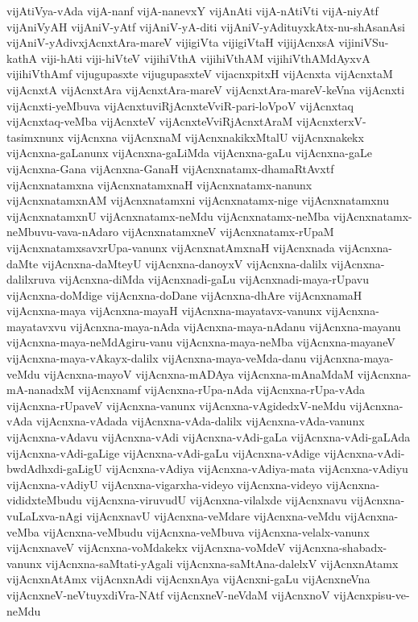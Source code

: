{vijAtiVya-vAda
vijA-nanf
vijA-nanevxY
vijAnAti
vijA-nAtiVti
vijA-niyAtf
vijAniVyAH
vijAniV-yAtf
vijAniV-yA-diti
vijAniV-yAdituyxkAtx-nu-shAsanAsi
vijAniV-yAdivxjAcnxtAra-mareV
vijigiVta
vijigiVtaH
vijijAcnxsA
vijiniVSu-kathA
viji-hAti
viji-hiVteV
vijihiVthA
vijihiVthAM
vijihiVthAMdAyxvA
vijihiVthAmf
vijugupasxte
vijugupasxteV
vijacnxpitxH
vijAcnxta
vijAcnxtaM
vijAcnxtA
vijAcnxtAra
vijAcnxtAra-mareV
vijAcnxtAra-mareV-keVna
vijAcnxti
vijAcnxti-yeMbuva
vijAcnxtuviRjAcnxteVviR-pari-loVpoV
vijAcnxtaq
vijAcnxtaq-veMba
vijAcnxteV
vijAcnxteVviRjAcnxtAraM
vijAcnxterxV-tasimxnunx
vijAcnxna
vijAcnxnaM
vijAcnxnakikxMtalU
vijAcnxnakekx
vijAcnxna-gaLanunx
vijAcnxna-gaLiMda
vijAcnxna-gaLu
vijAcnxna-gaLe
vijAcnxna-Gana
vijAcnxna-GanaH
vijAcnxnatamx-dhamaRtAvxtf
vijAcnxnatamxna
vijAcnxnatamxnaH
vijAcnxnatamx-nanunx
vijAcnxnatamxnAM
vijAcnxnatamxni
vijAcnxnatamx-nige
vijAcnxnatamxnu
vijAcnxnatamxnU
vijAcnxnatamx-neMdu
vijAcnxnatamx-neMba
vijAcnxnatamx-neMbuvu-vava-nAdaro
vijAcnxnatamxneV
vijAcnxnatamx-rUpaM
vijAcnxnatamxsavxrUpa-vanunx
vijAcnxnatAmxnaH
vijAcnxnada
vijAcnxna-daMte
vijAcnxna-daMteyU
vijAcnxna-danoyxV
vijAcnxna-dalilx
vijAcnxna-dalilxruva
vijAcnxna-diMda
vijAcnxnadi-gaLu
vijAcnxnadi-maya-rUpavu
vijAcnxna-doMdige
vijAcnxna-doDane
vijAcnxna-dhAre
vijAcnxnamaH
vijAcnxna-maya
vijAcnxna-mayaH
vijAcnxna-mayatavx-vanunx
vijAcnxna-mayatavxvu
vijAcnxna-maya-nAda
vijAcnxna-maya-nAdanu
vijAcnxna-mayanu
vijAcnxna-maya-neMdAgiru-vanu
vijAcnxna-maya-neMba
vijAcnxna-mayaneV
vijAcnxna-maya-vAkayx-dalilx
vijAcnxna-maya-veMda-danu
vijAcnxna-maya-veMdu
vijAcnxna-mayoV
vijAcnxna-mADAya
vijAcnxna-mAnaMdaM
vijAcnxna-mA-nanadxM
vijAcnxnamf
vijAcnxna-rUpa-nAda
vijAcnxna-rUpa-vAda
vijAcnxna-rUpaveV
vijAcnxna-vanunx
vijAcnxna-vAgidedxV-neMdu
vijAcnxna-vAda
vijAcnxna-vAdada
vijAcnxna-vAda-dalilx
vijAcnxna-vAda-vanunx
vijAcnxna-vAdavu
vijAcnxna-vAdi
vijAcnxna-vAdi-gaLa
vijAcnxna-vAdi-gaLAda
vijAcnxna-vAdi-gaLige
vijAcnxna-vAdi-gaLu
vijAcnxna-vAdige
vijAcnxna-vAdi-bwdAdhxdi-gaLigU
vijAcnxna-vAdiya
vijAcnxna-vAdiya-mata
vijAcnxna-vAdiyu
vijAcnxna-vAdiyU
vijAcnxna-vigarxha-videyo
vijAcnxna-videyo
vijAcnxna-vididxteMbudu
vijAcnxna-viruvudU
vijAcnxna-vilalxde
vijAcnxnavu
vijAcnxna-vuLaLxva-nAgi
vijAcnxnavU
vijAcnxna-veMdare
vijAcnxna-veMdu
vijAcnxna-veMba
vijAcnxna-veMbudu
vijAcnxna-veMbuva
vijAcnxna-velalx-vanunx
vijAcnxnaveV
vijAcnxna-voMdakekx
vijAcnxna-voMdeV
vijAcnxna-shabadx-vanunx
vijAcnxna-saMtati-yAgali
vijAcnxna-saMtAna-dalelxV
vijAcnxnAtamx
vijAcnxnAtAmx
vijAcnxnAdi
vijAcnxnAya
vijAcnxni-gaLu
vijAcnxneVna
vijAcnxneV-neVtuyxdiVra-NAtf
vijAcnxneV-neVdaM
vijAcnxnoV
vijAcnxpisu-ve-neMdu
}
